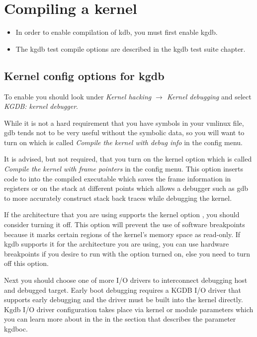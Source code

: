 \documentclass[a4paper,8pt,english]{sphinxmanual}
\begin{document}
\section{Compiling a kernel}
\label{dev-tools/kgdb:compiling-a-kernel}\begin{itemize}
\item {} 
In order to enable compilation of kdb, you must first enable kgdb.

\item {} 
The kgdb test compile options are described in the kgdb test suite
chapter.

\end{itemize}


\subsection{Kernel config options for kgdb}
\label{dev-tools/kgdb:kernel-config-options-for-kgdb}
To enable  you should look under
\emph{Kernel hacking \(\rightarrow\) Kernel debugging} and select
\emph{KGDB: kernel debugger}.

While it is not a hard requirement that you have symbols in your vmlinux
file, gdb tends not to be very useful without the symbolic data, so you
will want to turn on  which is called
\emph{Compile the kernel with debug info} in the config menu.

It is advised, but not required, that you turn on the
 kernel option which is called \emph{Compile
the kernel with frame pointers} in the config menu. This option inserts code
to into the compiled executable which saves the frame information in
registers or on the stack at different points which allows a debugger
such as gdb to more accurately construct stack back traces while
debugging the kernel.

If the architecture that you are using supports the kernel option
, you should consider turning it off. This
option will prevent the use of software breakpoints because it marks
certain regions of the kernel's memory space as read-only. If kgdb
supports it for the architecture you are using, you can use hardware
breakpoints if you desire to run with the 
option turned on, else you need to turn off this option.

Next you should choose one of more I/O drivers to interconnect debugging
host and debugged target. Early boot debugging requires a KGDB I/O
driver that supports early debugging and the driver must be built into
the kernel directly. Kgdb I/O driver configuration takes place via
kernel or module parameters which you can learn more about in the in the
section that describes the parameter kgdboc.
\end{document}
